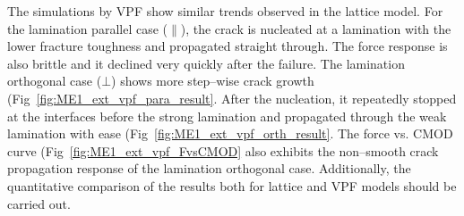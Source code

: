 The simulations by VPF show similar trends observed in the lattice model.
For the lamination parallel case ($\parallel$), the crack is nucleated at a lamination with the lower fracture toughness and propagated straight through.
The force response is also brittle and it declined very quickly after the failure.
The lamination orthogonal case ($\bot$) shows more step--wise crack growth (Fig~\ref{fig:ME1_ext_vpf_para_result}. 
After the nucleation, it repeatedly stopped at the interfaces before the strong lamination and propagated through the weak lamination with ease (Fig~\ref{fig:ME1_ext_vpf_orth_result}.
The force vs. CMOD curve (Fig~\ref{fig:ME1_ext_vpf_FvsCMOD} also exhibits the non--smooth crack propagation response of the lamination orthogonal case. Additionally, the quantitative comparison of the results both for lattice and VPF models should be carried out.
